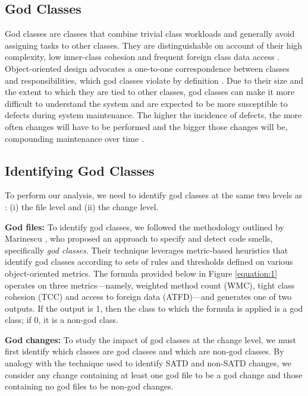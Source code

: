\subsection{God Classes}
God classes are classes that combine trivial class workloads and generally avoid assigning tasks to other classes. They are distinguishable on account of their high complexity, low inner-class cohesion and frequent foreign class data access \cite{lanza2007object}. Object-oriented design advocates a one-to-one correspondence between classes and responsibilities, which god classes violate by definition \cite{lanza2007object}. Due to their size and the extent to which they are tied to other classes, god classes can make it more difficult to understand the system \cite{fowler1999refactoring} and are expected to be more susceptible to defects during system maintenance. The higher the incidence of defects, the more often changes will have to be performed and the bigger those changes will be, compounding maintenance over time \cite{fowler1999refactoring, lanza2007object}.

\subsection{Identifying God Classes}
\label{ch4_god}

To perform our analysis, we need to identify god classes at the same two levels as \SATD: (i) the file level and (ii) the change level.

\noindent\textbf{God files:} To identify god classes, we followed the methodology outlined by Marinescu \cite{marinescu2004detection}, who proposed an approach to specify and detect
code smells, specifically \textit{god classes}. Their technique leverages metric-based heuristics that identify god classes according to sets of rules and thresholds defined on various object-oriented metrics. The formula provided below in Figure \ref{equation:1} operates on three metrics---namely, weighted method count (WMC), tight class cohesion (TCC) and access to foreign data (ATFD)---and generates one of two outputs. If the output is 1, then the class to which the formula is applied is a god class; if 0, it is a non-god class.

\noindent\textbf{God changes:}
To study the impact of god classes at the change level, we must first identify which classes are god classes and which are non-god classes. By analogy with the technique used to identify SATD and non-SATD changes, we consider any change containing at least one god file to be a god change and those containing no god files to be non-god changes. 



